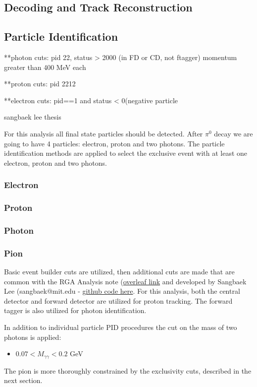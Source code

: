 \subsection{Decoding and Track Reconstruction}\label{sec:decrec}

\subsection{Particle Identification}
**photon cuts:
pid 22, status > 2000 (in FD or CD, not ftagger)
momentum greater than 400 MeV each

**proton cuts: pid 2212

**electron cuts: pid==1 and status < 0(negative particle

sangbaek lee thesis \parencite{Lee2022MeasurementDetector}

For this analysis all final state particles should be detected.
After $\pi^0$ decay we are going to have 4 particles: electron, proton and two photons.
The particle identification methods are applied to select the exclusive event with at least one electron, proton and two photons. 


    \subsubsection{Electron}
    \subsubsection{Proton}
    \subsubsection{Photon}
    \subsubsection{Pion}
    
    Basic event builder cuts are utilized, then additional cuts are made that are common with the RGA Analysis note (\href{https://www.overleaf.com/project/5ea737720942930001ff5e9c}{overleaf link} and developed by Sangbaek Lee (sangbaek@mit.edu - \href{https://github.com/Sangbaek/analysis_code/tree/analysis/pid}{github code here}. For this analysis, both the central detector and forward detector are utilized for proton tracking. The forward tagger is also utilized for photon identification. 
    


    In addition to individual particle PID procedures the cut on the mass of two photons is applied:
    \begin{itemize}
    	\item $0.07<M_{\gamma\gamma}<0.2$ GeV
    \end{itemize}
    The pion is more thoroughly constrained by the exclusivity cuts, described in the next section.
    

